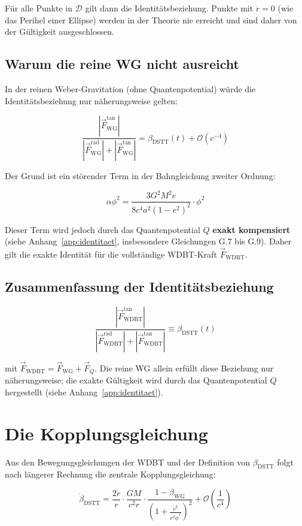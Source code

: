 Für alle Punkte in \(\mathcal{D}\) gilt dann die Identitätsbeziehung. Punkte mit \(\dot{r} = 0\) (wie das Perihel einer Ellipse) werden in der Theorie nie erreicht und sind daher von der Gültigkeit ausgeschlossen.

\subsection{Warum die reine WG nicht ausreicht}

In der reinen Weber-Gravitation (ohne Quantenpotential) würde die Identitätsbeziehung nur näherungsweise gelten:

\[
\frac{|\vec{F}_{\text{WG}}^{\text{tan}}|}{|\vec{F}_{\text{WG}}^{\text{rad}}| + |\vec{F}_{\text{WG}}^{\text{tan}}|} = \beta_{\text{DSTT}}(t) + \mathcal{O}(c^{-4})
\]

Der Grund ist ein störender Term in der Bahngleichung zweiter Ordnung:

\[
\alpha\phi^2 = \frac{3G^2M^2 e}{8c^4 a^2(1-e^2)^2} \cdot \phi^2
\]

Dieser Term wird jedoch durch das Quantenpotential \(Q\) \textbf{exakt kompensiert} (siehe Anhang~\ref{app:identitaet}, insbesondere Gleichungen G.7 bis G.9). Daher gilt die exakte Identität für die vollständige WDBT-Kraft \(\vec{F}_{\text{WDBT}}\).

\subsection{Zusammenfassung der Identitätsbeziehung}

\[
\boxed{\frac{|\vec{F}_{\text{WDBT}}^{\text{tan}}|}{|\vec{F}_{\text{WDBT}}^{\text{rad}}| + |\vec{F}_{\text{WDBT}}^{\text{tan}}|} \equiv \beta_{\text{DSTT}}(t)}
\]

mit \(\vec{F}_{\text{WDBT}} = \vec{F}_{\text{WG}} + \vec{F}_Q\). Die reine WG allein erfüllt diese Beziehung nur näherungsweise; die exakte Gültigkeit wird durch das Quantenpotential \(Q\) hergestellt (siehe Anhang~\ref{app:identitaet}).

\section{Die Kopplungsgleichung}
\label{sec:kopplungsgleichung}

Aus den Bewegungsgleichungen der WDBT und der Definition von \(\beta_{\text{DSTT}}\) folgt nach längerer Rechnung die zentrale Kopplungsgleichung:

\[
\dot{\beta}_{\text{DSTT}} = \frac{2\dot{r}}{r} \cdot \frac{GM}{c^2 r} \cdot \frac{1 - \beta_{\text{WG}}}{\left(1 + \frac{\dot{r}^2}{r^2\dot{\phi}^2}\right)^2} + \mathcal{O}\left(\frac{1}{c^4}\right)
\]

